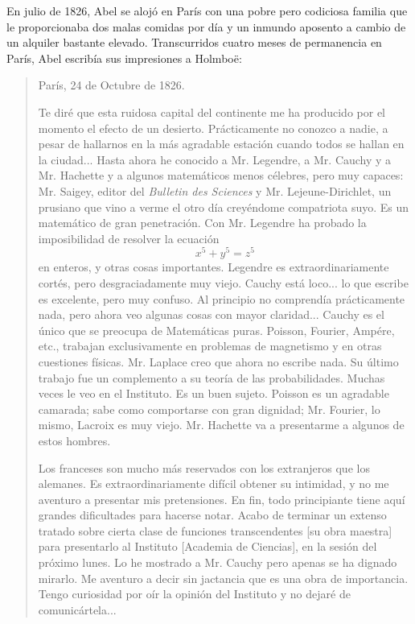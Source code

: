 \documentclass[a4paper, 12pt, draft]{article}
\begin{document}
En julio de 1826, Abel se alojó en París con una pobre pero codiciosa familia que le proporcionaba dos malas comidas por día y un inmundo aposento a cambio de un alquiler bastante elevado. Transcurridos cuatro meses de permanencia en París, Abel escribía sus impresiones a Holmboë:

\begin{quote}\small

\hfill París, 24 de Octubre de 1826.

\bigskip

Te diré que esta ruidosa capital del continente me ha producido por el momento el efecto de un desierto. Prácticamente no conozco a nadie, a pesar de hallarnos en la más agradable estación cuando todos se hallan en la ciudad...  Hasta ahora he conocido a Mr. Legendre, a Mr. Cauchy y a Mr. Hachette y a algunos matemáticos menos célebres, pero muy capaces: Mr. Saigey, editor del {\it Bulletin des Sciences} y Mr. Lejeune-Dirichlet, un prusiano que vino a verme el otro día creyéndome compatriota suyo. Es un matemático de gran penetración. Con Mr. Legendre ha probado la imposibilidad de resolver la ecuación
$$
x^5+y^5=z^5
$$
en enteros, y otras cosas importantes. Legendre es extraordinariamente cortés, pero desgraciadamente muy viejo. Cauchy está loco...  lo que escribe es excelente, pero muy confuso. Al principio no comprendía prácticamente nada, pero ahora veo algunas cosas con mayor claridad...  Cauchy es el único que se preocupa de Matemáticas puras. Poisson, Fourier, Ampére, etc., trabajan exclusivamente en problemas de magnetismo y en otras cuestiones físicas. Mr. Laplace creo que ahora no escribe nada. Su último trabajo fue un complemento a su teoría de las probabilidades. Muchas veces le veo en el Instituto. Es un buen sujeto. Poisson es un agradable camarada; sabe como comportarse con gran dignidad; Mr. Fourier, lo mismo, Lacroix es muy viejo. Mr. Hachette va a presentarme a algunos de estos hombres.

Los franceses son mucho más reservados con los extranjeros que los alemanes. Es extraordinariamente difícil obtener su intimidad, y no me aventuro a presentar mis pretensiones. En fin, todo principiante tiene aquí grandes dificultades para hacerse notar. Acabo de terminar un extenso tratado sobre cierta clase de funciones transcendentes [su obra maestra] para presentarlo al Instituto [Academia de Ciencias], en la sesión del próximo lunes. Lo he mostrado a Mr. Cauchy pero apenas se ha dignado mirarlo. Me aventuro a decir sin jactancia que es una obra de importancia. Tengo curiosidad por oír la opinión del Instituto y no dejaré de comunicártela...

\end{quote}
\end{document}
